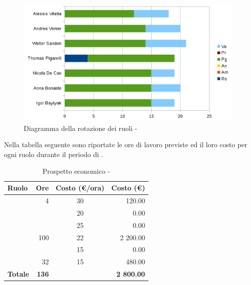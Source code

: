 \documentclass[12pt,a4paper]{article}
\begin{document}
\begin{center}
	\begin{figure}[H]
		\centering	
        \includegraphics[width=\textwidth]{../img/diagrammaBarreProgettazioneDiDettaglioRotazioneRuoli.png}
		\caption{Diagramma della rotazione dei ruoli - \FPD{}}
	\end{figure}
\end{center}

\newpage
{}
Nella tabella seguente sono riportate le ore di lavoro previste ed il loro costo per ogni ruolo durante il periodo di \FPD{}.

\begin{table}[H]
	\begin{center}
		\begin{tabular}{l r c r}
			\toprule
			\textbf{Ruolo}	& \textbf{Ore} & \textbf{Costo (\euro/ora)}	& \textbf{Costo (\euro)} \\ \midrule
			\midrule
			\RE{} & 4 & 30 & 120.00 \\ \midrule
			\AM{} & & 20 & 0.00 \\ \midrule
			\AN{} & & 25 & 0.00 \\ \midrule
			\PG{} & 100 & 22 & 2 200.00 \\ \midrule
			\PR{} & & 15 & 0.00 \\ \midrule
			\VR{} & 32 & 15 & 480.00 \\ \midrule
			\textbf{Totale} & \textbf{136} &  & \textbf{2 800.00} \\
			\bottomrule
		\end{tabular}
		\caption{Prospetto economico - \FPD{}}
	\end{center}
\end{table}
\end{document}
